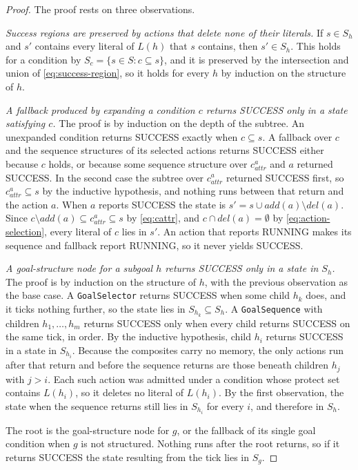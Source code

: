     \begin{proof}
        The proof rests on three observations.

        \emph{Success regions are preserved by actions that delete none of their literals.}
        If $s \in S_h$ and $s'$ contains every literal of $L(h)$ that $s$ contains, then $s' \in S_h$.
        This holds for a condition by $S_c = \{s \in S : c \subseteq s\}$, and it is preserved by the intersection and union of \eqref{eq:success-region}, so it holds for every $h$ by induction on the structure of $h$.

        \emph{A fallback produced by expanding a condition $c$ returns SUCCESS only in a state satisfying $c$.}
        The proof is by induction on the depth of the subtree.
        An unexpanded condition returns SUCCESS exactly when $c \subseteq s$.
        A fallback over $c$ and the sequence structures of its selected actions returns SUCCESS either because $c$ holds, or because some sequence structure over $c^a_{attr}$ and $a$ returned SUCCESS.
        In the second case the subtree over $c^a_{attr}$ returned SUCCESS first, so $c^a_{attr} \subseteq s$ by the inductive hypothesis, and nothing runs between that return and the action $a$.
        When $a$ reports SUCCESS the state is $s' = s \cup add(a) \setminus del(a)$.
        Since $c \setminus add(a) \subseteq c^a_{attr} \subseteq s$ by \eqref{eq:cattr}, and $c \cap del(a) = \emptyset$ by \eqref{eq:action-selection}, every literal of $c$ lies in $s'$.
        An action that reports RUNNING makes its sequence and fallback report RUNNING, so it never yields SUCCESS.

        \emph{A goal-structure node for a subgoal $h$ returns SUCCESS only in a state in $S_h$.}
        The proof is by induction on the structure of $h$, with the previous observation as the base case.
        A \texttt{GoalSelector} returns SUCCESS when some child $h_k$ does, and it ticks nothing further, so the state lies in $S_{h_k} \subseteq S_h$.
        A \texttt{GoalSequence} with children $h_1, \ldots, h_m$ returns SUCCESS only when every child returns SUCCESS on the same tick, in order.
        By the inductive hypothesis, child $h_i$ returns SUCCESS in a state in $S_{h_i}$.
        Because the composites carry no memory, the only actions run after that return and before the sequence returns are those beneath children $h_j$ with $j > i$.
        Each such action was admitted under a condition whose protect set contains $L(h_i)$, so it deletes no literal of $L(h_i)$.
        By the first observation, the state when the sequence returns still lies in $S_{h_i}$ for every $i$, and therefore in $S_h$.

        The root is the goal-structure node for $g$, or the fallback of its single goal condition when $g$ is not structured.
        Nothing runs after the root returns, so if it returns SUCCESS the state resulting from the tick lies in $S_g$.
    \end{proof}

